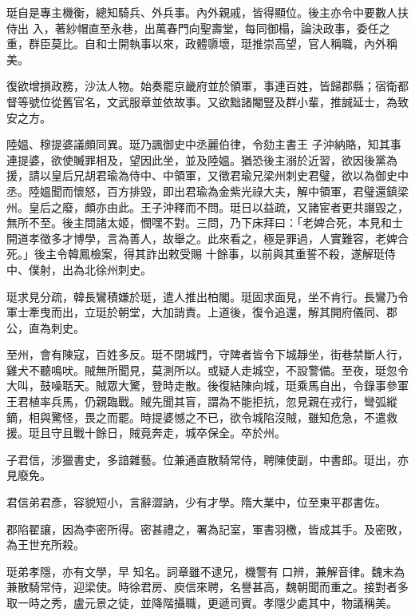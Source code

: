 \begin{pinyinscope}
 珽自是專主機衡，總知騎兵、外兵事。內外親戚，皆得顯位。後主亦令中要數人扶侍出
 入，著紗帽直至永巷，出萬春門向聖壽堂，每同御榻，論決政事，委任之重，群臣莫比。自和士開執事以來，政體隳壞，珽推崇高望，官人稱職，內外稱美。



 復欲增損政務，沙汰人物。始奏罷京畿府並於領軍，事連百姓，皆歸郡縣；宿衛都督等號位從舊官名，文武服章並依故事。又欲黜諸閹豎及群小輩，推誠延士，為致安之方。



 陸媼、穆提婆議頗同異。珽乃諷御史中丞麗伯律，令劾主書王
 子沖納賂，知其事連提婆，欲使贓罪相及，望因此坐，並及陸媼。猶恐後主溺於近習，欲因後黨為援，請以皇后兄胡君瑜為侍中、中領軍，又徵君瑜兄梁州刺史君璧，欲以為御史中丞。陸媼聞而懷怒，百方排毀，即出君瑜為金紫光祿大夫，解中領軍，君璧還鎮梁州。皇后之廢，頗亦由此。王子沖釋而不問。珽日以益疏，又諸宦者更共譖毀之，無所不至。後主問諸太姬，憫嘿不對。三問，乃下床拜曰：「老婢合死，本見和士開道孝徵多才博學，言為善人，故舉之。此來看之，極是罪過，人實難容，老婢合死。」後主令韓鳳檢案，得其詐出敕受賜
 十餘事，以前與其重誓不殺，遂解珽侍中、僕射，出為北徐州刺史。



 珽求見分疏，韓長鸞積嫌於珽，遣人推出柏閣。珽固求面見，坐不肯行。長鸞乃令軍士牽曳而出，立珽於朝堂，大加誚責。上道後，復令追還，解其開府儀同、郡公，直為刺史。



 至州，會有陳寇，百姓多反。珽不閉城門，守陴者皆令下城靜坐，街巷禁斷人行，雞犬不聽鳴吠。賊無所聞見，莫測所以。或疑人走城空，不設警備。至夜，珽忽令大叫，鼓噪聒天。賊眾大驚，登時走散。後復結陳向城，珽乘馬自出，令錄事參軍王君植率兵馬，仍親臨戰。賊先聞其盲，謂為不能拒抗，忽見親在戎行，彎弧縱鏑，相與驚怪，畏之而罷。時提婆憾之不已，欲令城陷沒賊，雖知危急，不遣救援。珽且守且戰十餘日，賊竟奔走，城卒保全。卒於州。



 子君信，涉獵書史，多諳雜藝。位兼通直散騎常侍，聘陳使副，中書郎。珽出，亦見廢免。



 君信弟君彥，容貌短小，言辭澀訥，少有才學。隋大業中，位至東平郡書佐。



 郡陷翟讓，因為李密所得。密甚禮之，署為記室，軍書羽檄，皆成其手。及密敗，為王世充所殺。



 珽弟孝隱，亦有文學，早
 知名。詞章雖不逮兄，機警有
 口辨，兼解音律。魏末為兼散騎常侍，迎梁使。時徐君房、庾信來聘，名譽甚高，魏朝聞而重之。接對者多取一時之秀，盧元景之徒，並降階攝職，更遞司賓。孝隱少處其中，物議稱美。




\end{pinyinscope}
